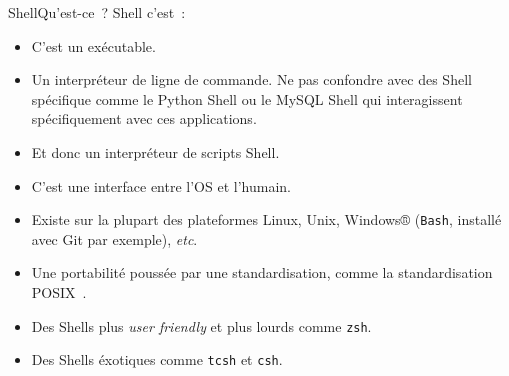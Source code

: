 \documentclass{beamer}
\begin{document}
    \begin{frame}{Shell}{Qu'est-ce~?}
        Shell c'est~:
        \begin{itemize}
            \item C'est un exécutable.
            \item Un interpréteur de ligne de commande.
            Ne pas confondre avec des Shell spécifique comme le Python Shell ou le MySQL Shell qui interagissent spécifiquement avec ces applications.
            \item Et donc un interpréteur de scripts Shell.
            \item C'est une interface entre l'OS et l'humain.
            \item Existe sur la plupart des plateformes Linux, Unix, Windows® (\lstinline{Bash}, installé avec Git par exemple), \textit{etc}.
            \item Une portabilité poussée par une standardisation, comme la standardisation POSIX~.
            \item Des Shells plus \textit{user friendly} et plus lourds comme \lstinline{zsh}.
            \item Des Shells éxotiques comme \lstinline{tcsh} et \lstinline{csh}.
        \end{itemize}
    \end{frame}
\end{document}
